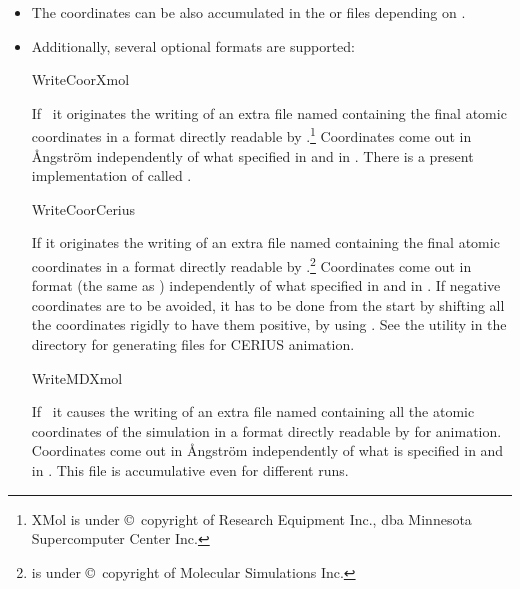 \begin{itemize}
  \item The coordinates can be also accumulated
  in the  or  files
  depending on .

  \item Additionally, several optional formats are supported:
  \begin{fdflogicalF}{WriteCoorXmol}

    If \fdftrue\ it originates the writing of an extra file named
     containing the final atomic coordinates in a format
    directly readable by .\footnote{XMol is under
        \copyright\ copyright of Research Equipment Inc., dba
        Minnesota Supercomputer Center Inc.} Coordinates come out in
    \AA ngstr\"om independently of what specified in
     and in
    . There is a present 
    implementation of  called .
    
  \end{fdflogicalF}
  
  \begin{fdflogicalF}{WriteCoorCerius}

    If \fdftrue it originates the writing of an extra file named
     containing the final atomic coordinates in a format
    directly readable by .\footnote{ is
        under \copyright\ copyright of Molecular Simulations Inc.}
    Coordinates come out in  format (the same as
    ) independently of what specified
    in  and in
    .  If negative coordinates are to be
    avoided, it has to be done from the start by shifting all the
    coordinates rigidly to have them positive, by using
    .  See the
     utility in the
     directory for generating  files for CERIUS animation.

  \end{fdflogicalF}

  \begin{fdflogicalF}{WriteMDXmol}

    If \fdftrue\ it causes the writing of an extra file
    named  containing all the atomic
    coordinates of the simulation in a format directly readable by
     for animation. Coordinates come out in
    \AA ngstr\"om independently of what is specified in
     and in .
    This file is accumulative even for different runs.
    

\end{fdflogicalF}
\end{itemize}
